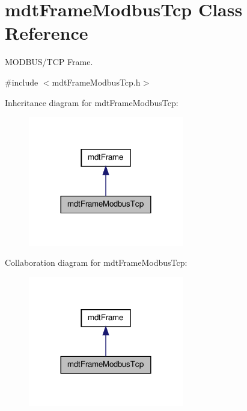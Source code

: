\hypertarget{classmdt_frame_modbus_tcp}{
\section{mdtFrameModbusTcp Class Reference}
\label{classmdt_frame_modbus_tcp}
}


MODBUS/TCP Frame.  




{\ttfamily \#include $<$mdtFrameModbusTcp.h$>$}



Inheritance diagram for mdtFrameModbusTcp:\nopagebreak
\begin{figure}[H]
\begin{center}
\leavevmode
\includegraphics[width=192pt]{classmdt_frame_modbus_tcp__inherit__graph}
\end{center}
\end{figure}


Collaboration diagram for mdtFrameModbusTcp:\nopagebreak
\begin{figure}[H]
\begin{center}
\leavevmode
\includegraphics[width=192pt]{classmdt_frame_modbus_tcp__coll__graph}
\end{center}
\end{figure}
